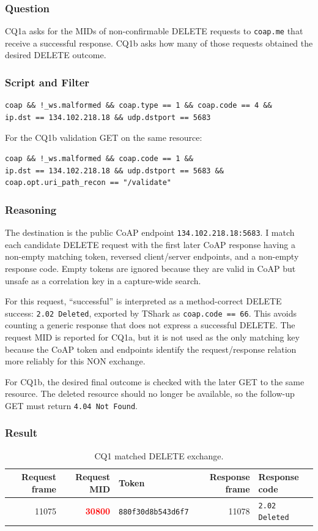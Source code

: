 \documentclass[a4paper,11pt]{article}
\newcommand{\answer}[1]{\textbf{\textcolor{red}{#1}}}
\newcommand{\code}[1]{\texttt{#1}}
\newcommand{\scriptpath}[1]{\path{#1}}
\begin{document}
\subsubsection{Question}
CQ1a asks for the MIDs of non-confirmable DELETE requests to
\code{coap.me} that receive a successful response. CQ1b asks how many of those
requests obtained the desired DELETE outcome.

\subsubsection{Script and Filter}
\scriptpath{part1/scripts/cq1_a_delete_success.py}

\begin{lstlisting}
coap && !_ws.malformed && coap.type == 1 && coap.code == 4 &&
ip.dst == 134.102.218.18 && udp.dstport == 5683
\end{lstlisting}

For the CQ1b validation GET on the same resource:
\begin{lstlisting}
coap && !_ws.malformed && coap.code == 1 &&
ip.dst == 134.102.218.18 && udp.dstport == 5683 &&
coap.opt.uri_path_recon == "/validate"
\end{lstlisting}

\subsubsection{Reasoning}
The destination is the public CoAP endpoint \code{134.102.218.18:5683}. I match each
candidate DELETE request with the first later CoAP response having a non-empty
matching token, reversed client/server endpoints, and a non-empty response code.
Empty tokens are ignored because they are valid in CoAP but unsafe as a correlation
key in a capture-wide search.

For this request, ``successful'' is interpreted as a method-correct DELETE success:
\code{2.02 Deleted}, exported by TShark as \code{coap.code == 66}. This avoids
counting a generic response that does not express a successful DELETE. The request
MID is reported for CQ1a, but it is not used as the only matching key because the
CoAP token and endpoints identify the request/response relation more reliably for
this NON exchange.

For CQ1b, the desired final outcome is checked with the later GET to the same
resource. The deleted resource should no longer be available, so the follow-up GET
must return \code{4.04 Not Found}.

\subsubsection{Result}
\begin{table}[H]
\centering
\caption{CQ1 matched DELETE exchange.}
\begin{tabularx}{\textwidth}{@{}r r X r l@{}}
\toprule
Request frame & Request MID & Token & Response frame & Response code \\
\midrule
11075 & \answer{30800} & \code{880f30d8b543d6f7} & 11078 & \code{2.02 Deleted} \\
\bottomrule
\end{tabularx}
\end{table}
\end{document}
